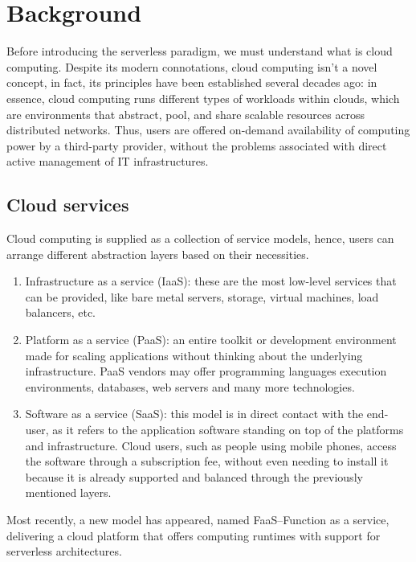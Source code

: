 \chapter{Background}
\label{chap:background}

Before introducing the serverless paradigm,
we must understand what is cloud computing\cite{nist}.
Despite its modern connotations, cloud computing
isn't a novel concept, in fact, its principles have been established
several decades ago: in essence, cloud computing
runs different types of workloads within clouds, which are environments that abstract, pool,
and share scalable resources across distributed networks.
Thus, users are offered on-demand availability of computing power by a third-party provider,
without the problems associated with direct active management of IT infrastructures.

\section{Cloud services}

Cloud computing is supplied as a collection of service models,
hence, users can arrange different abstraction layers based on their necessities.

\begin{enumerate}
  \item Infrastructure as a service (IaaS): these are the most low-level services that can be provided,
    like bare metal servers, storage, virtual machines, load balancers, etc.
  \item Platform as a service (PaaS): an entire toolkit or development environment
    made for scaling applications without thinking about the underlying infrastructure.
    PaaS vendors may offer programming languages execution environments, databases,
    web servers and many more technologies.
  \item Software as a service (SaaS): this model is in direct contact with the end-user,
    as it refers to the application software standing on top of the platforms and infrastructure.
    Cloud users, such as people using mobile phones, access the software through a subscription fee,
    without even needing to install it because it is already supported and balanced through
    the previously mentioned layers.
\end{enumerate}

Most recently, a new model has appeared, named FaaS--Function as a service,
delivering a cloud platform that offers computing runtimes with support for serverless architectures.

